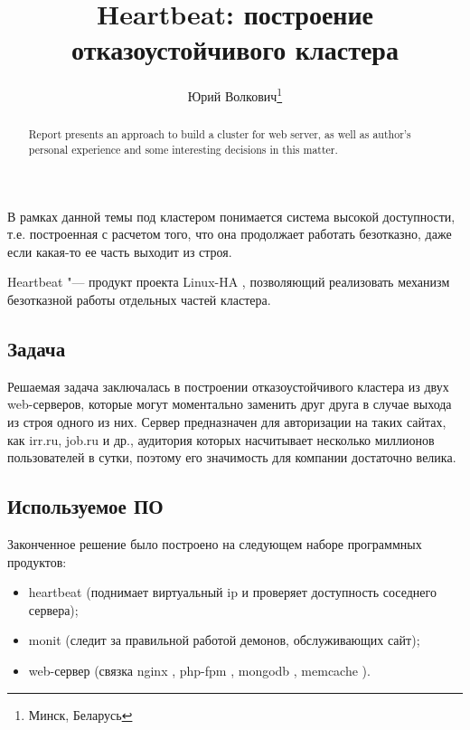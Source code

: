 \documentclass[10pt, a5paper]{article}
\begin{document}
\title{Heartbeat: построение отказоустойчивого кластера}%

\author{Юрий Волкович\footnote{Минск, Беларусь}}
\maketitle

\begin{abstract}
Report presents an approach to build a cluster for web server, as well as author's personal experience and some interesting decisions in this matter.
\end{abstract}

В рамках данной темы под кластером понимается система высокой доступности,
т.е. построенная с расчетом того, что она продолжает работать безотказно,
даже если какая-то ее часть выходит из строя.

Heartbeat "--- продукт проекта Linux-HA \cite{Volkovich1}, позволяющий реализовать механизм безотказной работы отдельных частей кластера.

\subsection*{Задача}

Решаемая задача заключалась в построении отказоустойчивого кластера из двух web-серверов, которые могут моментально заменить друг друга в случае выхода из строя одного из них. Сервер предназначен для авторизации на таких сайтах, как irr.ru, job.ru и др., аудитория которых насчитывает несколько миллионов пользователей в сутки, поэтому его значимость для компании достаточно велика.

\subsection*{Используемое ПО}

Законченное решение было построено на следующем наборе программных продуктов:

\begin{itemize}
  \item heartbeat (поднимает виртуальный ip и проверяет доступность соседнего сервера);
  \item monit \cite{Volkovich2} (следит за правильной работой демонов, обслуживающих сайт);
  \item web-сервер (связка nginx \cite{Volkovich3}, php-fpm \cite{Volkovich4}, mongodb \cite{Volkovich5}, memcache \cite{Volkovich6}).
\end{itemize}
\end{document}
